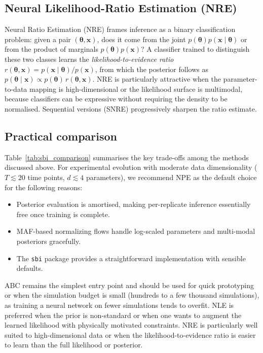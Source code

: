 \documentclass[11pt]{article}
\newcommand{\btheta}{\boldsymbol{\theta}}
\newcommand{\bx}{\mathbf{x}}
\begin{document}
\subsection{Neural Likelihood-Ratio Estimation (NRE)}
\label{sec:nre}

Neural Ratio Estimation (NRE) \citep{hermans2020likelihood} frames inference
as a binary classification problem: given a pair $(\btheta, \bx)$, does it
come from the joint $p(\btheta)p(\bx\mid\btheta)$ or from the product of
marginals $p(\btheta)p(\bx)$?
A classifier trained to distinguish these two classes learns the
\emph{likelihood-to-evidence ratio}
$r(\btheta, \bx) = p(\bx\mid\btheta)/p(\bx)$,
from which the posterior follows as
$p(\btheta\mid\bx) \propto p(\btheta)\,r(\btheta,\bx)$.
NRE is particularly attractive when the parameter-to-data mapping is
high-dimensional or the likelihood surface is multimodal, because classifiers
can be expressive without requiring the density to be normalised.
Sequential versions (SNRE) progressively sharpen the ratio estimate.

\subsection{Practical comparison}
\label{sec:comparison}

Table~\ref{tab:sbi_comparison} summarises the key trade-offs among the
methods discussed above.
For experimental evolution with moderate data dimensionality
($T \lesssim 20$ time points, $d \lesssim 4$ parameters), we recommend NPE
as the default choice for the following reasons:
\begin{itemize}
  \item Posterior evaluation is amortised, making per-replicate inference
        essentially free once training is complete.
  \item MAF-based normalizing flows handle log-scaled parameters and
        multi-modal posteriors gracefully.
  \item The \texttt{sbi} package \citep{tejero2020sbi} provides a
        straightforward implementation with sensible defaults.
\end{itemize}
ABC remains the simplest entry point and should be used for quick
prototyping or when the simulation budget is small (hundreds to a few
thousand simulations), as training a neural network on fewer simulations
tends to overfit.
NLE is preferred when the prior is non-standard or when one wants to
augment the learned likelihood with physically motivated constraints.
NRE is particularly well suited to high-dimensional data or when the
likelihood-to-evidence ratio is easier to learn than the full likelihood
or posterior.
\end{document}
